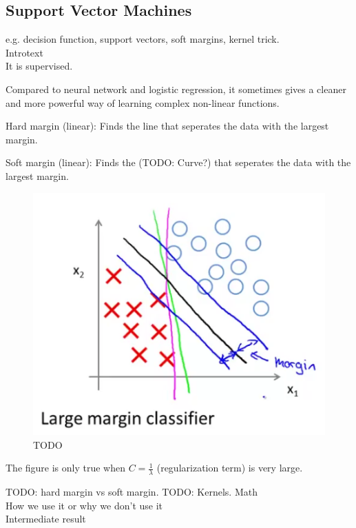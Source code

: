 
\subsection{Support Vector Machines}

e.g. decision function, support vectors, soft margins, kernel trick.\\

Introtext\\

It is supervised.

Compared to neural network and logistic regression, it sometimes gives a cleaner and more powerful way of learning complex non-linear functions.

Hard margin (linear): Finds the line that seperates the data with the largest margin.

Soft margin (linear): Finds the (TODO: Curve?) that seperates the data with the largest margin.

\begin{figure}[H]
\centering
\includegraphics{billeder/svm-margin}
\caption{TODO}
\label{fig:svm-margin}
\end{figure}
The figure is only true when $C = \frac{1}{\lambda}$ (regularization term) is very large.

TODO: hard margin vs soft margin. 
TODO: Kernels.
Math\\

How we use it or why we don't use it\\

Intermediate result\\

